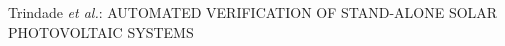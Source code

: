 \documentclass[journal]{IEEEtran}
\begin{document}
{Trindade \MakeLowercase{\textit{et al.}}: AUTOMATED VERIFICATION OF STAND-ALONE SOLAR PHOTOVOLTAIC SYSTEMS}
% 











\maketitle
\end{document}

